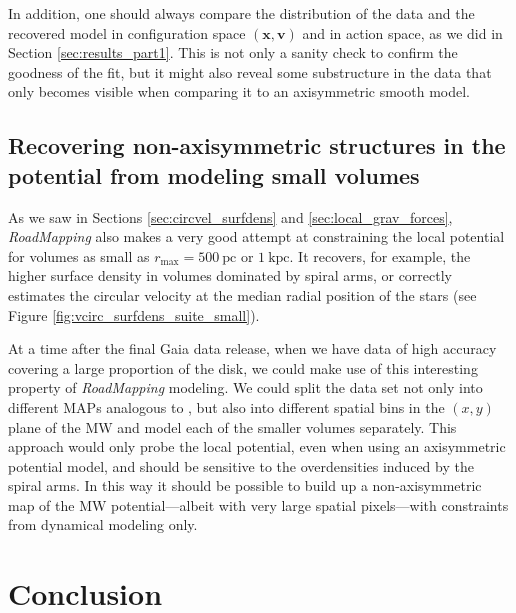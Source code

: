 \documentclass[iop,revtex4,numberedappendix,appendixfloats]{emulateapj}
\newcommand{\vect}[1]{\boldsymbol{#1}}
\newcommand{\RM}{{\sl RoadMapping}}
\newcommand{\NEW}[1]{\textcolor{Green}{#1}}
\newcommand{\OLD}[1]{}
\begin{document}
In addition, one should always compare the distribution of the data and the recovered model in configuration space $(\vect{x},\vect{v})$ and in action space, as we did in Section \ref{sec:results_part1}. This is not only a sanity check to confirm the goodness of the fit, but it might also reveal some substructure in the data that only becomes visible when comparing it to an axisymmetric smooth model.

\subsection{Recovering non-axisymmetric structures in the potential from modeling small volumes}

As we saw in Sections \ref{sec:circvel_surfdens} and \OLD{\ref{sec:forces_bias}}\NEW{\ref{sec:local_grav_forces}}, \RM{} also makes a very good attempt at constraining the local potential for volumes as small as $r_\text{max}=500~\text{pc}$ or $1~\text{kpc}$. It recovers, for example, the higher surface density in volumes dominated by spiral arms, or correctly estimates the circular velocity at the median radial position of the stars (see Figure \ref{fig:vcirc_surfdens_suite_small}). 

At a time after the final Gaia data release, when we have data of high accuracy covering a large proportion of the disk, we could make use of this interesting property of \RM{} modeling. We could split the data set not only into different MAPs analogous to \citet{2013ApJ...779..115B}, but also into different spatial bins in the $(x,y)$ plane of the MW and model each of the smaller volumes separately. This approach would only probe the local potential, even when using an axisymmetric potential model, and should be sensitive to the overdensities induced by the spiral arms. In this way it should be possible to build up a non-axisymmetric map of the MW potential---albeit with very large spatial pixels---with constraints from dynamical modeling only.

\section{Conclusion} \label{sec:conclusion}
\end{document}
